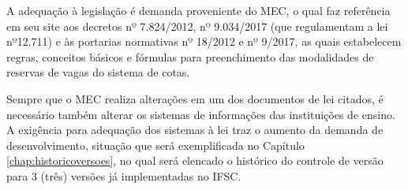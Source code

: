  A adequação à legislação é demanda proveniente do \gls{MEC}, o qual faz referência em seu site aos decretos nº 7.824/2012, nº 9.034/2017 (que regulamentam a lei nº12.711) e às portarias normativas nº 18/2012 e nº 9/2017, as quais estabelecem regras, conceitos básicos e fórmulas para preenchimento das modalidades de reservas de vagas do sistema de cotas. 
 
 Sempre que o \gls{MEC} realiza alterações em um dos documentos de lei citados, é necessário também alterar os sistemas de informações das instituições de ensino. A exigência para adequação dos sistemas à lei traz o aumento da demanda de desenvolvimento, situação que será exemplificada no Capítulo  \ref{chap:historicoversoes}, no qual será elencado o histórico do controle de versão para 3 (três) versões já implementadas no \gls{IFSC}.
 
 

 
 
